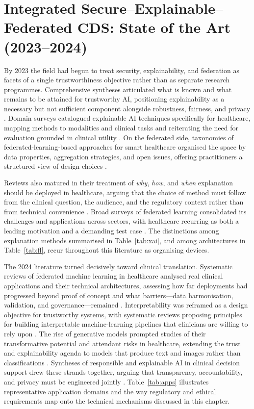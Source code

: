 \documentclass[11pt,a4paper]{article}
\begin{document}
\section{Integrated Secure--Explainable--Federated CDS: State of the Art (2023--2024)}
By 2023 the field had begun to treat security, explainability, and federation as
facets of a single trustworthiness objective rather than as separate research
programmes. Comprehensive syntheses articulated what is known and what remains to
be attained for trustworthy AI, positioning explainability as a necessary but not
sufficient component alongside robustness, fairness, and privacy \cite{ref35}.
Domain surveys catalogued explainable AI techniques specifically for healthcare,
mapping methods to modalities and clinical tasks and reiterating the need for
evaluation grounded in clinical utility \cite{ref36}. On the federated side,
taxonomies of federated-learning-based approaches for smart healthcare organised
the space by data properties, aggregation strategies, and open issues, offering
practitioners a structured view of design choices \cite{ref37}.

Reviews also matured in their treatment of \emph{why}, \emph{how}, and
\emph{when} explanation should be deployed in healthcare, arguing that the choice
of method must follow from the clinical question, the audience, and the
regulatory context rather than from technical convenience \cite{ref38}. Broad
surveys of federated learning consolidated its challenges and applications across
sectors, with healthcare recurring as both a leading motivation and a demanding
test case \cite{ref39}. The distinctions among explanation methods summarised in
Table~\ref{tab:xai}, and among architectures in Table~\ref{tab:fl}, recur
throughout this literature as organising devices.

The 2024 literature turned decisively toward clinical translation. Systematic
reviews of federated machine learning in healthcare analysed real clinical
applications and their technical architectures, assessing how far deployments had
progressed beyond proof of concept and what barriers---data harmonisation,
validation, and governance---remained \cite{ref40}. Interpretability was
reframed as a design objective for trustworthy systems, with systematic reviews
proposing principles for building interpretable machine-learning pipelines that
clinicians are willing to rely upon \cite{ref41}. The rise of generative models
prompted studies of their transformative potential and attendant risks in
healthcare, extending the trust and explainability agenda to models that produce
text and images rather than classifications \cite{ref42}. Syntheses of
responsible and explainable AI in clinical decision support drew these strands
together, arguing that transparency, accountability, and privacy must be
engineered jointly \cite{ref43}. Table~\ref{tab:apps} illustrates representative
application domains and the way regulatory and ethical requirements map onto the
technical mechanisms discussed in this chapter.
\end{document}
